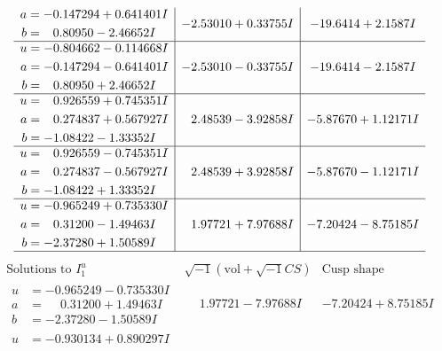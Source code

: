 \documentclass[1p]{elsarticle_modified}
\theoremstyle{definition}
\newcommand{\I}{\sqrt{-1}}
\begin{document}
$$\begin{array}{c|c|c}
\begin{aligned}
a &= -0.147294 + 0.641401 I \\
b &= \phantom{-}0.80950 - 2.46652 I\end{aligned}
 & -2.53010 + 0.33755 I & -19.6414 + 2.1587 I \\ \hline\begin{aligned}
u &= -0.804662 - 0.114668 I \\
a &= -0.147294 - 0.641401 I \\
b &= \phantom{-}0.80950 + 2.46652 I\end{aligned}
 & -2.53010 - 0.33755 I & -19.6414 - 2.1587 I \\ \hline\begin{aligned}
u &= \phantom{-}0.926559 + 0.745351 I \\
a &= \phantom{-}0.274837 + 0.567927 I \\
b &= -1.08422 - 1.33352 I\end{aligned}
 & \phantom{-}2.48539 - 3.92858 I & -5.87670 + 1.12171 I \\ \hline\begin{aligned}
u &= \phantom{-}0.926559 - 0.745351 I \\
a &= \phantom{-}0.274837 - 0.567927 I \\
b &= -1.08422 + 1.33352 I\end{aligned}
 & \phantom{-}2.48539 + 3.92858 I & -5.87670 - 1.12171 I \\ \hline\begin{aligned}
u &= -0.965249 + 0.735330 I \\
a &= \phantom{-}0.31200 - 1.49463 I \\
b &= -2.37280 + 1.50589 I\end{aligned}
 & \phantom{-}1.97721 + 7.97688 I & -7.20424 - 8.75185 I\\
 \hline 
 \end{array}$$\newpage$$\begin{array}{c|c|c}  
\text{Solutions to }I^u_{1}& \I (\text{vol} + \sqrt{-1}CS) & \text{Cusp shape}\\
 \hline 
\begin{aligned}
u &= -0.965249 - 0.735330 I \\
a &= \phantom{-}0.31200 + 1.49463 I \\
b &= -2.37280 - 1.50589 I\end{aligned}
 & \phantom{-}1.97721 - 7.97688 I & -7.20424 + 8.75185 I \\ \hline\begin{aligned}
u &= -0.930134 + 0.890297 I \\

\end{aligned}
\end{array}$$
\end{document}
